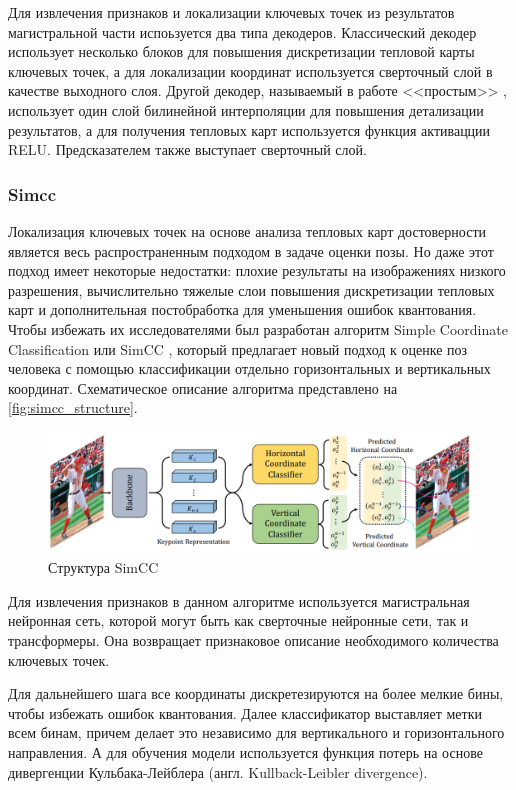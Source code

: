 Для извлечения признаков и локализации ключевых точек из результатов магистральной части испоьзуется два типа декодеров. Классический декодер использует несколько блоков для повышения дискретизации тепловой карты ключевых точек, а для локализации координат используется сверточный слой в качестве выходного слоя. Другой декодер, называемый в работе <<простым>> \cite{vitpose}, использует один слой билинейной интерполяции для повышения детализации результатов, а для получения тепловых карт используется функция активацции RELU. Предсказателем также выступает сверточный слой.


\subsubsection*{Simcc}

Локализация ключевых точек на основе анализа тепловых карт достоверности является весь распространенным подходом в задаче оценки позы. Но даже этот подход имеет некоторые недостатки: плохие результаты на изображениях низкого разрешения, вычислительно тяжелые слои повышения дискретизации тепловых карт и дополнительная постобработка для уменьшения ошибок квантования. Чтобы избежать их исследователями был разработан алгоритм Simple Coordinate Classification или SimCC \cite{simcc}, который предлагает новый подход к оценке поз человека с помощью классификации отдельно горизонтальных и вертикальных координат. Схематическое описание алгоритма представлено на \autoref{fig:simcc_structure}.

\begin{figure}[h]
	\centering
	\includegraphics[width=.8\textwidth]{./images/simcc_structure}
	\caption{Структура SimCC \cite{simcc}}
	\label{fig:simcc_structure}
\end{figure}

Для извлечения признаков в данном алгоритме используется магистральная нейронная сеть, которой могут быть как сверточные нейронные сети, так и трансформеры. Она возвращает признаковое описание необходимого количества ключевых точек.

Для дальнейшего шага все координаты дискретезируются на более мелкие бины, чтобы избежать ошибок квантования. Далее классификатор выставляет метки всем бинам, причем делает это независимо для вертикального и горизонтального направления. А для обучения модели используется функция потерь на основе дивергенции Кульбака-Лейблера (англ. Kullback-Leibler divergence).

